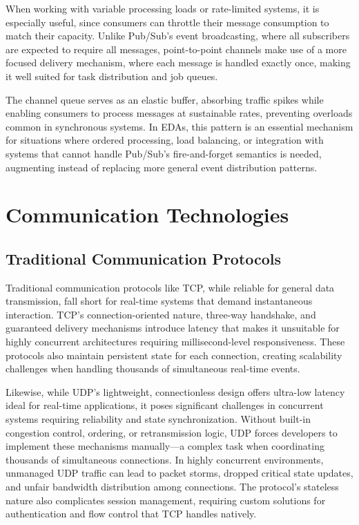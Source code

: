 \documentclass[]{final}
\begin{document}
When working with variable processing loads or rate-limited systems, it is
especially useful, since consumers can throttle their message consumption to
match their capacity. Unlike Pub/Sub's event broadcasting, where all
subscribers are expected to require all messages, point-to-point channels
make use of a more focused delivery mechanism, where each message is
handled exactly once, making it well suited for task distribution and
job queues.

The channel queue serves as an elastic buffer, absorbing traffic spikes while
enabling consumers to process messages at sustainable rates, preventing
overloads common in synchronous systems. In EDAs, this pattern is an
essential mechanism for situations where ordered processing, load balancing,
or integration with systems that cannot handle Pub/Sub's fire-and-forget
semantics is needed, augmenting instead of replacing more general event
distribution patterns.

\newpage

\section{Communication Technologies}


\subsection{Traditional Communication Protocols}

Traditional communication protocols like TCP, while reliable for general data
transmission, fall short for real-time systems that demand instantaneous
interaction. TCP's connection-oriented nature, three-way handshake, and
guaranteed delivery mechanisms introduce latency that makes it unsuitable for
highly concurrent architectures requiring millisecond-level responsiveness.
These protocols also maintain persistent state for each connection, creating
scalability challenges when handling thousands of simultaneous real-time
events.

Likewise, while UDP's lightweight, connectionless design offers ultra-low
latency ideal for real-time applications, it poses significant challenges
in concurrent systems requiring reliability and state synchronization. Without
built-in
congestion control, ordering, or retransmission logic, UDP forces developers to
implement these mechanisms manually—a complex task when coordinating thousands
of simultaneous connections. In highly concurrent environments, unmanaged
UDP traffic can lead to
packet storms, dropped critical state updates, and unfair bandwidth
distribution among connections. The protocol's stateless nature also
complicates session management, requiring custom solutions for authentication
and flow control that TCP handles natively.
\end{document}
